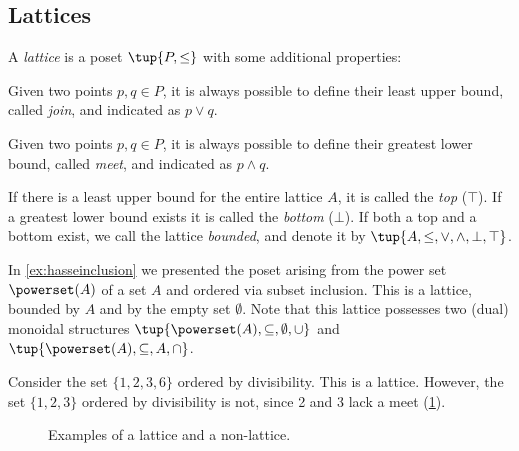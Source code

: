 \subsection{Lattices}
\begin{definition}[Lattice]
\label{def:lattice}
A \emph{lattice} is a poset $\tup{P, \leq}$ with some additional properties:
\begin{compactenum}
    \item Given two points $p, q \in P$, it is always possible to define their least upper bound, called \emph{join}, and indicated as $p \vee q$.
    \item Given two points $p, q \in P$, it is always possible to define their greatest lower bound, called \emph{meet}, and indicated as $p \wedge q$.
\end{compactenum}
\end{definition}

\begin{remark}
If there is a least upper bound for the entire lattice $A$, it is called
the \emph{top} ($\top$). If a greatest lower bound exists it is called the \emph{bottom} ($\bot$). If both a top and a bottom exist, we call the lattice \emph{bounded}, and denote it by $\tup{A,\leq,\vee,\wedge,\bot,\top}$.
\end{remark}

\begin{example}
    In \cref{ex:hasseinclusion} we presented the poset arising from the power set $\powerset(A)$ of a set $A$ and ordered via subset inclusion. This is a lattice, bounded by $A$ and by the empty set $\emptyset$. Note that this lattice possesses two (dual) monoidal structures $\tup{\powerset(A),\subseteq,\emptyset,\cup}$ and $\tup{\powerset(A),\subseteq,A,\cap}$.
\end{example}

\begin{example}
Consider the set $\{1,2,3,6\}$ ordered by divisibility. This is a lattice. However, the set $\{1,2,3\}$ ordered by divisibility is not, since 2 and 3 lack a meet (\cref{fig:exlattice}).
\begin{figure}[h!]
\begin{center}
\end{center}
\caption{Examples of a lattice and a non-lattice. \label{fig:exlattice}}
\end{figure}
\end{example}